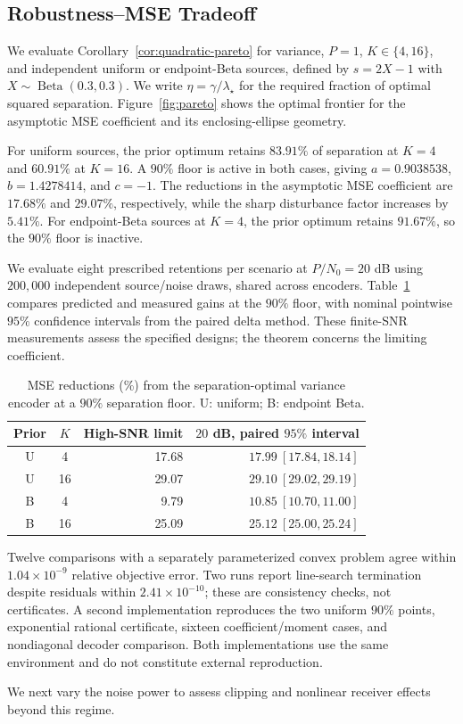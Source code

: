 \subsection{Robustness--MSE Tradeoff}
\label{sec:pareto-evidence}
We evaluate Corollary~\ref{cor:quadratic-pareto} for variance, $P=1$, $K\in\{4,16\}$, and independent uniform or endpoint-Beta sources, defined by $s=2X-1$ with $X\sim\operatorname{Beta}(0.3,0.3)$. We write $\eta=\gamma/\lambda_\star$ for the required fraction of optimal squared separation. Figure~\ref{fig:pareto} shows the optimal frontier for the asymptotic MSE coefficient and its enclosing-ellipse geometry.



For uniform sources, the prior optimum retains $83.91\%$ of separation at $K=4$ and $60.91\%$ at $K=16$. A $90\%$ floor is active in both cases, giving $a=0.9038538$, $b=1.4278414$, and $c=-1$. The reductions in the asymptotic MSE coefficient are $17.68\%$ and $29.07\%$, respectively, while the sharp disturbance factor increases by $5.41\%$. For endpoint-Beta sources at $K=4$, the prior optimum retains $91.67\%$, so the $90\%$ floor is inactive.

We evaluate eight prescribed retentions per scenario at $P/N_0=20$ dB using $200{,}000$ independent source/noise draws, shared across encoders. Table~\ref{tab:pareto} compares predicted and measured gains at the $90\%$ floor, with nominal pointwise $95\%$ confidence intervals from the paired delta method. These finite-SNR measurements assess the specified designs; the theorem concerns the limiting coefficient.

\begin{table}[t]
\caption{MSE reductions (\%) from the separation-optimal variance encoder at a $90\%$ separation floor. U: uniform; B: endpoint Beta.}
\label{tab:pareto}
\centering\small
\begin{tabular}{@{}ccrr@{}}\toprule
Prior & $K$ & High-SNR limit & $20$ dB, paired $95\%$ interval\\\midrule
U & 4 & 17.68 & $17.99\ [17.84,18.14]$\\
U & 16 & 29.07 & $29.10\ [29.02,29.19]$\\
B & 4 & 9.79 & $10.85\ [10.70,11.00]$\\
B & 16 & 25.09 & $25.12\ [25.00,25.24]$\\\bottomrule
\end{tabular}
\end{table}

Twelve comparisons with a separately parameterized convex problem agree within $1.04\times10^{-9}$ relative objective error. Two runs report line-search termination despite residuals within $2.41\times10^{-10}$; these are consistency checks, not certificates. A second implementation reproduces the two uniform $90\%$ points, exponential rational certificate, sixteen coefficient/moment cases, and nondiagonal decoder comparison. Both implementations use the same environment and do not constitute external reproduction.

We next vary the noise power to assess clipping and nonlinear receiver effects beyond this regime.
